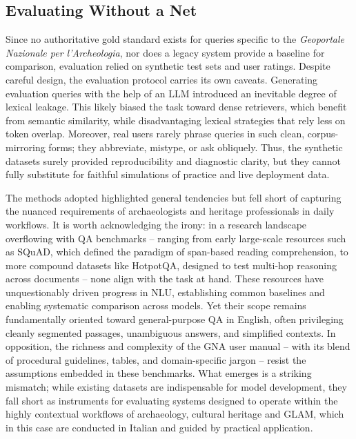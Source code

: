\begin{spacing}{1.5}
\section{Evaluating Without a Net}
Since no authoritative gold standard exists for queries specific to the \textit{Geoportale Nazionale per l'Archeologia}, nor does a legacy system provide a baseline for comparison, evaluation relied on synthetic test sets and user ratings. Despite careful design, the evaluation protocol carries its own caveats. Generating evaluation queries with the help of an LLM introduced an inevitable degree of lexical leakage. This likely biased the task toward dense retrievers, which benefit from semantic similarity, while disadvantaging lexical strategies that rely less on token overlap. Moreover, real users rarely phrase queries in such clean, corpus-mirroring forms; they abbreviate, mistype, or ask obliquely. Thus, the synthetic datasets surely provided reproducibility and diagnostic clarity, but they cannot fully substitute for faithful simulations of practice and live deployment data.

The methods adopted highlighted general tendencies but fell short of capturing the nuanced requirements of archaeologists and heritage professionals in daily workflows. It is worth acknowledging the irony: in a research landscape overflowing with QA benchmarks -- ranging from early large-scale resources such as SQuAD, which defined the paradigm of span-based reading comprehension, to more compound datasets like HotpotQA, designed to test multi-hop reasoning across documents -- none align with the task at hand. These resources have unquestionably driven progress in NLU, establishing common baselines and enabling systematic comparison across models. Yet their scope remains fundamentally oriented toward general-purpose QA in English, often privileging cleanly segmented passages, unambiguous answers, and simplified contexts. In opposition, the richness and complexity of the GNA user manual -- with its blend of procedural guidelines, tables, and domain-specific jargon -- resist the assumptions embedded in these benchmarks. What emerges is a striking mismatch; while existing datasets are indispensable for model development, they fall short as instruments for evaluating systems designed to operate within the highly contextual workflows of archaeology, cultural heritage and GLAM, which in this case are conducted in Italian and guided by practical application.



\end{spacing}
